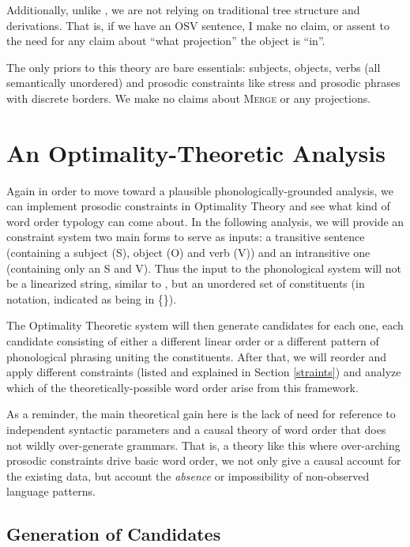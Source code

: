 \documentclass{article}
\begin{document}
Additionally, unlike \textcite{richards16}, we are not relying on traditional tree structure and derivations.
That is, if we have an OSV sentence, I make no claim, or assent to the need for any claim about ``what projection'' the object is ``in''.

The only priors to this theory are bare essentials: subjects, objects, verbs (all semantically unordered) and prosodic constraints like stress and prosodic phrases with discrete borders.
We make no claims about \textsc{Merge} or any projections.

\section{An Optimality-Theoretic Analysis\label{otanal}}

Again in order to move toward a plausible phonologically-grounded analysis, we can implement prosodic constraints in Optimality Theory \parencite{prince93} and see what kind of word order typology can come about.
In the following analysis, we will provide an constraint system two main forms to serve as inputs: a transitive sentence (containing a subject (S), object (O) and verb (V)) and an intransitive one (containing only an S and V).
Thus the input to the phonological system will not be a linearized string, similar to \textcite{halle87}, but an unordered set of constituents (in notation, indicated as being in \{\}).

The Optimality Theoretic system will then generate candidates for each one, each candidate consisting of either a different linear order or a different pattern of phonological phrasing uniting the constituents.
After that, we will reorder and apply different constraints (listed and explained in Section \ref{straints}) and analyze which of the theoretically-possible word order arise from this framework.

As a reminder, the main theoretical gain here is the lack of need for reference to independent syntactic parameters and a causal theory of word order that does not wildly over-generate grammars.
That is, a theory like this where over-arching prosodic constraints drive basic word order, we not only give a causal account for the existing data, but account the \emph{absence} or impossibility of non-observed language patterns.

\subsection{Generation of Candidates\label{generation}}
\end{document}
